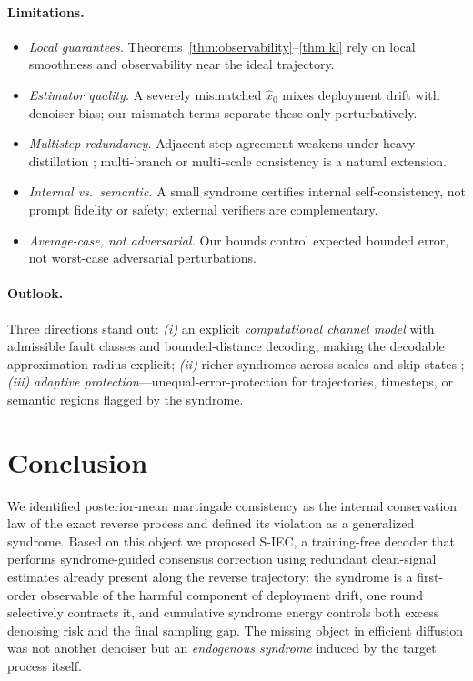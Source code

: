 \documentclass{article}
\theoremstyle{plain}
\theoremstyle{definition}
\theoremstyle{remark}
\newcommand{\SIEC}{\texorpdfstring{S\mbox{-}IEC\xspace}{S-IEC }}
\begin{document}
\paragraph{Limitations.}
\begin{itemize}[leftmargin=1.2em,itemsep=1pt,topsep=2pt]
  \item \emph{Local guarantees.} Theorems~\ref{thm:observability}--\ref{thm:kl}
    rely on local smoothness and observability near the ideal trajectory.
  \item \emph{Estimator quality.} A severely mismatched \(\hat x_0\) mixes
    deployment drift with denoiser bias; our mismatch terms separate
    these only perturbatively.
  \item \emph{Multistep redundancy.} Adjacent-step agreement weakens under
    heavy distillation \citep{song2023consistency}; multi-branch or
    multi-scale consistency is a natural extension.
  \item \emph{Internal vs.\ semantic.} A small syndrome certifies internal
    self-consistency, not prompt fidelity or safety; external verifiers
    \citep{christopher2024projected} are complementary.
  \item \emph{Average-case, not adversarial.} Our bounds control expected
    bounded error, not worst-case adversarial perturbations.
\end{itemize}

\paragraph{Outlook.}
Three directions stand out: \emph{(i)} an explicit \emph{computational channel
model} with admissible fault classes and bounded-distance decoding, making
the decodable approximation radius explicit; \emph{(ii)} richer syndromes
across scales and skip states \citep{mei2025unetbp}; \emph{(iii)}
\emph{adaptive protection}---unequal-error-protection for trajectories,
timesteps, or semantic regions flagged by the syndrome.

\section{Conclusion}
\label{sec:conclusion}

We identified posterior-mean martingale consistency as the internal
conservation law of the exact reverse process and defined its violation as
a generalized syndrome. Based on this object we proposed \SIEC, a
training-free decoder that performs syndrome-guided consensus correction
using redundant clean-signal estimates already present along the reverse
trajectory: the syndrome is a first-order observable of the harmful
component of deployment drift, one round selectively contracts it, and
cumulative syndrome energy controls both excess denoising risk and the
final sampling gap. The missing object in efficient diffusion was not
another denoiser but an \emph{endogenous syndrome} induced by the target
process itself.
\end{document}
